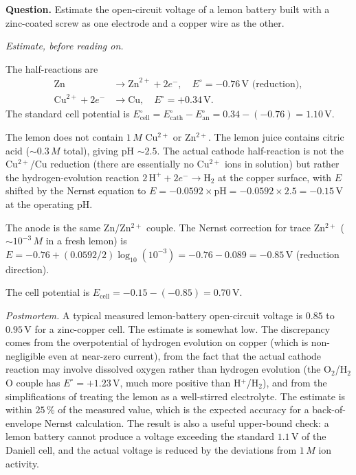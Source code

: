 \begin{estimation}
\textbf{Question.} Estimate the open-circuit voltage of a lemon
battery built with a zinc-coated screw as one electrode and a copper
wire as the other.

\smallskip
\textit{Estimate, before reading on.}

\smallskip
The half-reactions are
\begin{align*}
\text{Zn} &\to \text{Zn}^{2+} + 2 e^-, \quad E^\circ = -0.76\,\text{V}
\text{ (reduction)}, \\
\text{Cu}^{2+} + 2 e^- &\to \text{Cu}, \quad E^\circ = +0.34\,\text{V}.
\end{align*}
The standard cell potential is $E^\circ_{\text{cell}} = E^\circ_{\text{cath}}
- E^\circ_{\text{an}} = 0.34 - (-0.76) = 1.10\,\text{V}$.

The lemon does not contain $1\,M$ Cu$^{2+}$ or Zn$^{2+}$. The lemon
juice contains citric acid ($\sim 0.3\,M$ total), giving pH $\sim 2.5$.
The actual cathode half-reaction is not the Cu$^{2+}$/Cu reduction
(there are essentially no Cu$^{2+}$ ions in solution) but rather the
hydrogen-evolution reaction $2\,\text{H}^+ + 2 e^- \to \text{H}_2$ at
the copper surface, with $E$ shifted by the Nernst equation to
$E = -0.0592 \times \text{pH} = -0.0592 \times 2.5 = -0.15\,\text{V}$
at the operating pH.

The anode is the same Zn/Zn$^{2+}$ couple. The Nernst correction for
trace Zn$^{2+}$ ($\sim 10^{-3}\,M$ in a fresh lemon) is
$E = -0.76 + (0.0592/2) \log_{10}(10^{-3}) = -0.76 - 0.089 = -0.85\,
\text{V}$ (reduction direction).

The cell potential is $E_{\text{cell}} = -0.15 - (-0.85) = 0.70\,
\text{V}$.

\smallskip
\textit{Postmortem.} A typical measured lemon-battery open-circuit
voltage is $0.85$ to $0.95\,\text{V}$ for a zinc-copper cell. The
estimate is somewhat low. The discrepancy comes from the
overpotential of hydrogen evolution on copper (which is non-negligible
even at near-zero current), from the fact that the actual cathode
reaction may involve dissolved oxygen rather than hydrogen evolution
(the O$_2$/H$_2$O couple has $E^\circ = +1.23\,\text{V}$, much more
positive than H$^+$/H$_2$), and from the simplifications of treating
the lemon as a well-stirred electrolyte. The estimate is within $25\,
\%$ of the measured value, which is the expected accuracy for a
back-of-envelope Nernst calculation. The result is also a useful
upper-bound check: a lemon battery cannot produce a voltage exceeding
the standard $1.1\,\text{V}$ of the Daniell cell, and the actual
voltage is reduced by the deviations from $1\,M$ ion activity.
\end{estimation}

